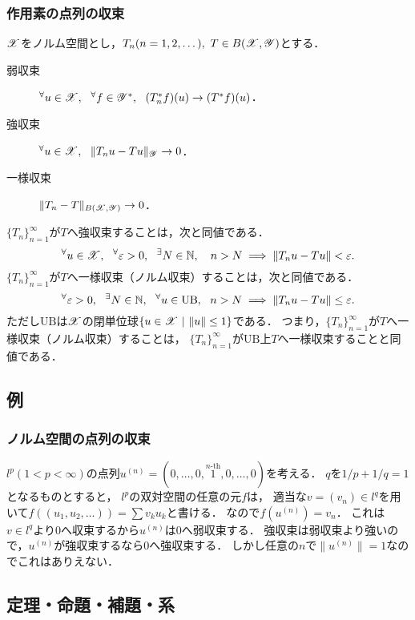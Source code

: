     \subsubsection{作用素の点列の収束}
    $\mathscr{X}$をノルム空間とし，$T_n (n=1,2,\dots),~ T \in B(\mathscr{X}, \mathscr{Y})$とする．
    \begin{description}
        \item[弱収束]\hspace{0.6em} ${}^{\forall} u \in \mathscr{X},~~ {}^{\forall} f \in \mathscr{Y}^*,~~ (T_n^*f)(u) \to (T^*f)(u)$．
        \item[強収束]\hspace{0.6em} ${}^{\forall} u \in \mathscr{X},~~ \|T_n u-T u\|_{\mathscr{Y}} \to 0$．
        \item[一様収束] $\|T_n-T\|_{B(\mathscr{X}, \mathscr{Y})} \to 0$．
    \end{description}
    $\{T_n\}_{n=1}^{\infty}$が$T$へ強収束することは，次と同値である．
    \[ {}^{\forall} u \in \mathscr{X},~~ {}^{\forall} \varepsilon>0,~~ {}^{\exists} N \in \mathbb{N},~~~ n>N \implies \| T_n u-T u \| < \varepsilon. \]
    $\{T_n\}_{n=1}^{\infty}$が$T$へ一様収束（ノルム収束）することは，次と同値である．
    \[ {}^{\forall} \varepsilon>0,~~ {}^{\exists} N \in \mathbb{N},~~ {}^{\forall} u \in \mathrm{UB},~~ n>N \implies \| T_n u-T u \| \leq \varepsilon. \]
    ただし$\mathrm{UB}$は$\mathscr{X}$の閉単位球$\{u \in \mathscr{X} ~|~ \|u\| \leq 1\}$である．
    つまり，$\{T_n\}_{n=1}^{\infty}$が$T$へ一様収束（ノルム収束）することは，
    $\{T_n\}_{n=1}^{\infty}$が$\mathrm{UB}$上$T$へ一様収束することと同値である．

    \subsection{例}
    \subsubsection{ノルム空間の点列の収束}
    \begin{Example}[p.191]
        $l^p (1<p<\infty)$の点列$u^{(n)}=(0,\dots,0,\overset{n\text{-th}}{1},0,\dots,0)$を考える．
        $q$を$1/p+1/q=1$となるものとすると，
        $l^p$の双対空間の任意の元$f$は，
        適当な$v=(v_n) \in l^q$を用いて$f((u_1,u_2,\dots))=\sum v_k u_k$と書ける．
        なので$f(u^{(n)})=v_n$．
        これは$v \in l^q$より0へ収束するから$u^{(n)}$は0へ弱収束する．
        強収束は弱収束より強いので，$u^{(n)}$が強収束するなら0へ強収束する．
        しかし任意の$n$で$\|u^{(n)}\|=1$なのでこれはありえない．
    \end{Example}

    \subsection{定理・命題・補題・系}
